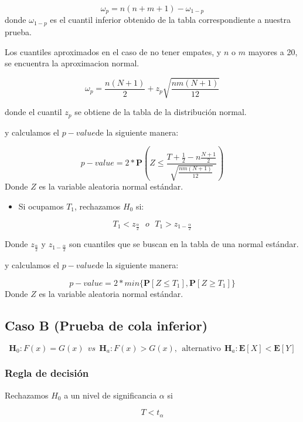 \documentclass[
  a4paper,
  oneside,
  openany]{book}
\providecommand{\tightlist}{%
  \setlength{\itemsep}{0pt}\setlength{\parskip}{0pt}}
\begin{document}
\[\omega_p= n(n+m+1)-\omega_{1-p}\]
donde \(\omega_{1-p}\) es el cuantil inferior obtenido de la tabla correspondiente a nuestra prueba.

Los cuantiles aproximados en el caso de no tener empates, y \(n\) o \(m\) mayores a 20, se encuentra la aproximacion normal.

\[\omega_p= \frac{n(N+1)}{2} + z_p\sqrt{\frac{n m(N+1)}{12}}\]

donde el cuantil \(z_p\) se obtiene de la tabla de la distribución normal.

y calculamos el \(p-value\)de la siguiente manera:

\[p-value = 2*\mathbf{P}\left(Z\leq\frac{T+\frac{1}{2}-n\frac{N+1}{2}}{\sqrt{\frac{nm(N+1)}{12}}}\right)\]
Donde \(Z\) es la variable aleatoria normal estándar.

\begin{itemize}
\tightlist
\item
  Si ocupamos \(T_{1}\), rechazamos \(H_0\) si:
\end{itemize}

\[T_{1} < z_{\frac{\alpha}{2}} \ \ \  o \ \ \  T_{1} > z_{1-\frac{\alpha}{2}}\]

Donde \(z_\frac{\alpha}{2}\) y \(z_{1-\frac{\alpha}{2}}\) son cuantiles que se buscan en la tabla de una normal estándar.

y calculamos el \(p-value\)de la siguiente manera:

\[p-value=2*min\{\mathbf{P}[Z\leq T_{1}],\mathbf{P}[Z\geq T_{1}]\}\]
Donde \(Z\) es la variable aleatoria normal estándar.

\hypertarget{caso-b-prueba-de-cola-inferior-4}{%
\subsection*{Caso B (Prueba de cola inferior)}\label{caso-b-prueba-de-cola-inferior-4}}


\[\textbf{H}_0: F(x) = G(x) \ \ vs \ \ \textbf{H}_a: F(x) > G(x),  \ \ \mbox{alternativo} \ \ \textbf{H}_a:\mathbf{E}[X]  < \mathbf{E}[Y]\]

\hypertarget{regla-de-decisiuxf3n-14}{%
\subsubsection*{Regla de decisión}\label{regla-de-decisiuxf3n-14}}


Rechazamos \(H_0\) a un nivel de significancia \(\alpha\) si

\[T < t_{\alpha}\]
\end{document}
